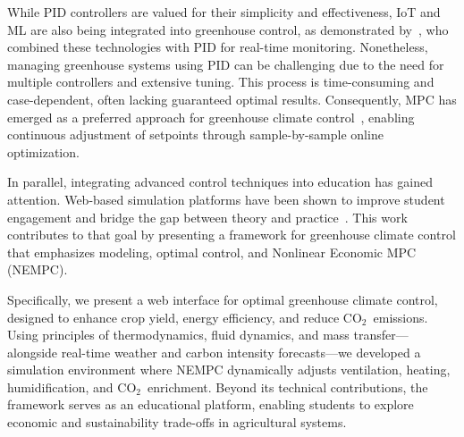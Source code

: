 \documentclass[conference]{IEEEtran}
\newcommand{\coo}{\ensuremath{\mathrm{CO_2}}}
\begin{document}
While PID controllers are valued for their simplicity and effectiveness, IoT and ML are also being integrated into greenhouse control, as demonstrated by~\cite{Wang2024}, who combined these technologies with PID for real-time monitoring. Nonetheless, managing greenhouse systems using PID can be challenging due to the need for multiple controllers and extensive tuning. This process is time-consuming and case-dependent, often lacking guaranteed optimal results. Consequently, MPC has emerged as a preferred approach for greenhouse climate control~\cite{Hu2022}, enabling continuous adjustment of setpoints through sample-by-sample online optimization.

In parallel, integrating advanced control techniques into education has gained attention. Web-based simulation platforms have been shown to improve student engagement and bridge the gap between theory and practice~\cite{WangEducation2024, Zakova2024}. This work contributes to that goal by presenting a framework for greenhouse climate control that emphasizes modeling, optimal control, and Nonlinear Economic MPC (NEMPC).

Specifically, we present a web interface for optimal greenhouse climate control, designed to enhance crop yield, energy efficiency, and reduce \coo\ emissions. Using principles of thermodynamics, fluid dynamics, and mass transfer—alongside real-time weather and carbon intensity forecasts—we developed a simulation environment where NEMPC dynamically adjusts ventilation, heating, humidification, and \coo\ enrichment. Beyond its technical contributions, the framework serves as an educational platform, enabling students to explore economic and sustainability trade-offs in agricultural systems.
\end{document}
